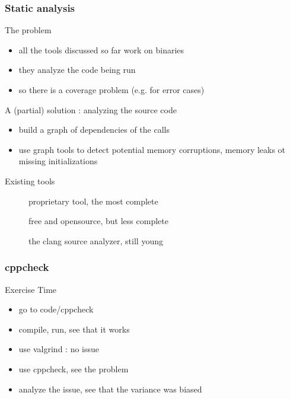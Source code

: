 \begin{frame}[fragile]
  \frametitle{Static analysis}
  \begin{alertblock}{The problem}
    \begin{itemize}
    \item all the tools discussed so far work on binaries
    \item they analyze the code being run
    \item so there is a coverage problem (e.g. for error cases)
    \end{itemize}
  \end{alertblock}
  \pause
  \begin{block}{A (partial) solution : analyzing the source code}
    \begin{itemize}
    \item build a graph of dependencies of the calls
    \item use graph tools to detect potential memory corruptions,
      memory leaks ot missing initializations
    \end{itemize}
  \end{block}
  \pause
  \begin{block}{Existing tools}
    \begin{description}
    \item[\href{http://www.coverity.com/}{}]
      proprietary tool, the most complete
    \item[\href{http://cppcheck.sourceforge.net/}{}]
      free and opensource, but less complete
    \item[\href{http://clang-analyzer.llvm.org/}{}]
      the clang source analyzer, still young
    \end{description}
  \end{block}
\end{frame}

\begin{frame}[fragile]
  \frametitle{cppcheck}
  \begin{alertblock}{Exercise Time}
    \begin{itemize}
    \item go to code/cppcheck
    \item compile, run, see that it works
    \item use valgrind : no issue
    \item use cppcheck, see the problem
    \item analyze the issue, see that the variance was biased
    \end{itemize}
  \end{alertblock}
\end{frame}
